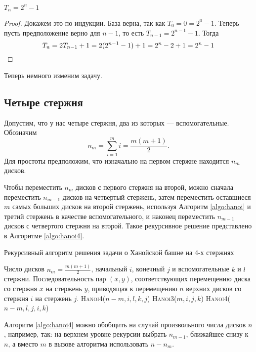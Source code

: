 \begin{theorem}
  $T_n = 2^{n} - 1$
\end{theorem}
\begin{proof}
  Докажем это по индукции. База верна, так как $T_0 = 0 = 2^{0} - 1$. Теперь 
  пусть предположение верно для $n - 1$, то есть $T_{n - 1} = 2^{n - 1} - 1$.
   Тогда \[T_{n} = 2T_{n - 1} + 1 = 2(2^{n - 1} - 1) + 1 = 2^n - 2 + 1 = 2^n - 1\qedhere\]
\end{proof}

Теперь немного изменим задачу.
\subsection{Четыре стержня}

Допустим, что у нас четыре стержня, два из которых --- вспомогательные. Обозначим
\[n_m = \sum_{i=1}^mi = \frac{m(m+1)}{2}.\]
Для простоты предположим, что изначально на первом стержне находится $n_m$ дисков.

Чтобы переместить $n_m$ дисков с первого стержня на второй, можно сначала 
переместить $n_{m-1}$ дисков на четвертый стержень, затем переместить оставшиеся
 $m$ самых больших дисков на второй стержень, используя Алгоритм \ref{algo:hanoi}
  и третий стержень в качестве вспомогательного, и наконец переместить $n_{m-1}$
   дисков с четвертого стержня на второй. Такое рекурсивное решение представлено
    в Алгоритме \ref{algo:hanoi4}.

\begin{algorithm}[H]
  \caption{Рекурсивный алгоритм решения задачи о Ханойской башне на 4-х стержнях}
  \label{algo:hanoi4}
  \begin{algorithmic}[1]
    \Require Число дисков $n_m = \frac{m(m + 1)}{2}$, начальный $i$, конечный $j$ и 
    вспомогательные $k$ и $l$ стержни.
    \Ensure Последовательность пар $(x, y)$, соответствующих перемещению диска 
    со стержня $x$ на стержень $y$, приводящая к перемещению $n$ верхних дисков
     со стержня $i$ на стержень $j$.
        \State \textsc{Hanoi4}($n-m, i, l, k, j$)
        \State \textsc{Hanoi3}($m, i, j, k$)
        \State \textsc{Hanoi4}($n-m, l, j, i, k$)
      \EndIf
    \EndFunction
  \end{algorithmic}
\end{algorithm}

Алгоритм \ref{algo:hanoi4} можно обобщить на случай произвольного числа дисков 
$n$, например, так: на верхнем уровне рекурсии выбрать $n_{m-1}$, ближайшее 
снизу к $n$, а вместо $m$ в вызове алгоритма  использовать 
$n - n_m$.

